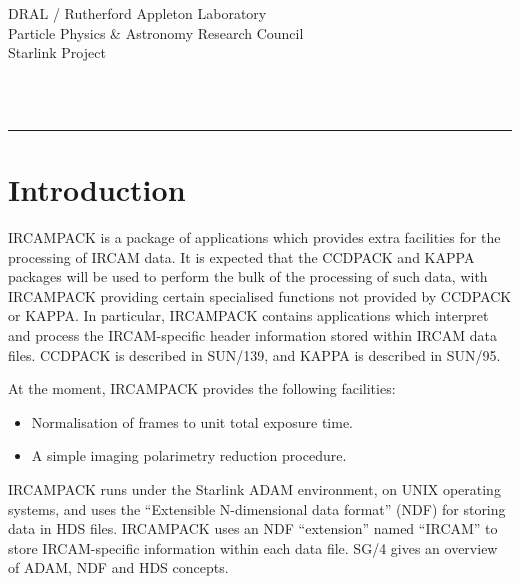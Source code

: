 \thispagestyle{empty}
DRAL / {\sc Rutherford Appleton Laboratory} \hfill {\bf \stardocname}\\
{\large Particle Physics \& Astronomy Research Council}\\
{\large Starlink Project\\}
{\large \stardoccategory\ \stardocnumber}
\begin{flushright}
\stardocauthors\\
\stardocdate
\end{flushright}
\vspace{-4mm}
\rule{\textwidth}{0.5mm}
\vspace{5mm}
\begin{center}
{\Large\bf \stardoctitle}
\end{center}
\vspace{5mm}

\setlength{\parskip}{0mm} \tableofcontents
\setlength{\parskip}{\medskipamount} \markright{\stardocname} \newpage 

\section{Introduction}

{\small IRCAMPACK} is a package of applications which provides extra
facilities for the processing of {\small IRCAM} data. It is expected
that the {\small CCDPACK} and {\small KAPPA} packages will be used to
perform the bulk of the processing of such data, with {\small
IRCAMPACK} providing certain specialised functions not provided by
{\small CCDPACK} or {\small KAPPA}. In particular, {\small IRCAMPACK}
contains applications which interpret and process the {\small
IRCAM}-specific header information stored within {\small IRCAM} data
files. {\small CCDPACK} is described in SUN/139, and {\small KAPPA} is
described in SUN/95.

At the moment, {\small IRCAMPACK} provides the following facilities:

\begin{itemize}

\item Normalisation of frames to unit total exposure time.

\item A simple imaging polarimetry reduction procedure.

\end{itemize}

{\small IRCAMPACK} runs under the Starlink {\small ADAM} environment,
on {\small UNIX} operating systems, and uses the ``Extensible
N-dimensional data format'' ({\small NDF}) for storing data in {\small
HDS} files. {\small IRCAMPACK} uses an {\small NDF} ``extension'' named
``{\small IRCAM}'' to store {\small IRCAM}-specific information within
each data file. SG/4 gives an overview of {\small ADAM}, {\small NDF}
and {\small HDS} concepts.

